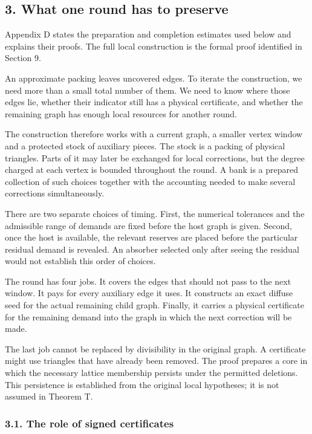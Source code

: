 \documentclass[english,11pt,a4paper]{article}
\begin{document}
\subsection{3. What one round has to preserve}\label{what-one-round-has-to-preserve}

Appendix D states the preparation and completion estimates used below and explains their proofs. The full local construction is the formal proof identified in Section 9.

An approximate packing leaves uncovered edges. To iterate the construction, we need more than a small total number of them. We need to know where those edges lie, whether their indicator still has a physical certificate, and whether the remaining graph has enough local resources for another round.

The construction therefore works with a current graph, a smaller vertex window and a protected stock of auxiliary pieces. The stock is a packing of physical triangles. Parts of it may later be exchanged for local corrections, but the degree charged at each vertex is bounded throughout the round. A bank is a prepared collection of such choices together with the accounting needed to make several corrections simultaneously.

There are two separate choices of timing. First, the numerical tolerances and the admissible range of demands are fixed before the host graph is given. Second, once the host is available, the relevant reserves are placed before the particular residual demand is revealed. An absorber selected only after seeing the residual would not establish this order of choices.

The round has four jobs. It covers the edges that should not pass to the next window. It pays for every auxiliary edge it uses. It constructs an exact diffuse seed for the actual remaining child graph. Finally, it carries a physical certificate for the remaining demand into the graph in which the next correction will be made.

The last job cannot be replaced by divisibility in the original graph. A certificate might use triangles that have already been removed. The proof prepares a core in which the necessary lattice membership persists under the permitted deletions. This persistence is established from the original local hypotheses; it is not assumed in Theorem T.

\subsubsection{3.1. The role of signed certificates}\label{the-role-of-signed-certificates}
\end{document}
